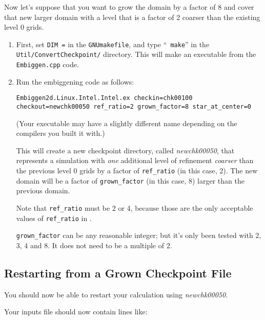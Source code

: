 Now let's suppose that you want to grow the domain by a factor of 8 and cover that
new larger domain with a level that is a factor of 2 coarser than the existing level 0 grids.

\begin{enumerate}

\item First, set {\tt DIM =} in the {\tt GNUmakefile}, and type ``{\tt
  make}'' in the {\tt Util/ConvertCheckpoint/} directory.  This will
  make an executable from the {\tt Embiggen.cpp} code.

\item Run the embiggening code as follows:

\begin{verbatim}
Embiggen2d.Linux.Intel.Intel.ex checkin=chk00100 checkout=newchk00050 ref_ratio=2 grown_factor=8 star_at_center=0
\end{verbatim}

(Your executable may have a slightly different name depending on the compilers you
built it with.)

This will create a new checkpoint directory, called {\it newchk00050}, that represents a simulation
with {\it one} additional level of refinement {\it coarser} than the previous level 0 grids by
a factor of {\tt ref\_ratio} (in this case, 2).   
The new domain will be a factor of {\tt grown\_factor} (in this case, 8) larger than the previous domain.

Note that {\tt ref\_ratio} must be 2 or 4, because those are the only acceptable values of {\tt ref\_ratio}
in \castro.

{\tt grown\_factor} can be any reasonable integer; but it's only been
tested with 2, 3, 4 and 8.  It does not need to be a multiple of 2.

\end{enumerate}

\subsection{Restarting from a Grown Checkpoint File}

You should now be able to restart your calculation using {\em newchk00050}.

Your inputs file should now contain lines like:

